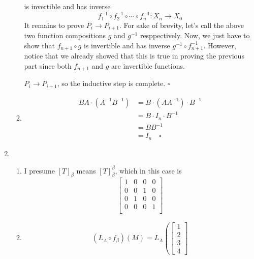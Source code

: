 \documentclass[12pt]{article}
\begin{document}
\begin{enumerate}
\begin{enumerate}
                        is invertible and has inverse
                        \[f_1^{-1} \circ f_2^{-1} \circ \cdots \circ f_n^{-1}: X_n \rightarrow X_0\]
                        It remains to prove $P_i \rightarrow P_{i+1}$.
                        For sake of brevity, let's call the above two function compositions $g$ and $g^{-1}$ resppectively.
                        Now, we just have to show that $f_{n+1} \circ g$ is invertible and has inverse $g^{-1} \circ f_{n+1}^{-1}$.
                        However, notice that we already showed that this is true in proving the previous part
                        since both $f_{n+1}$ and $g$ are invertible functions.

                        $P_i \rightarrow P_{i+1}$, so the inductive step is complete. $\square$
                  \item \begin{align*}
                              BA \cdot (A^{-1}B^{-1}) & = B \cdot (AA^{-1}) \cdot B^{-1} \\
                                                      & = B \cdot I_n \cdot B^{-1}       \\
                                                      & = BB^{-1}                        \\
                                                      & = I_n \quad\square
                        \end{align*}
            \end{enumerate}
      \item \begin{enumerate}
                  \item I presume $[T]_\beta$ means $[T]^\beta_\beta$, which in this case is
                        \[\begin{bmatrix}
                                    1 & 0 & 0 & 0 \\
                                    0 & 0 & 1 & 0 \\
                                    0 & 1 & 0 & 0 \\
                                    0 & 0 & 0 & 1 \\
                              \end{bmatrix}\]
                  \item \begin{gather*}
                              (L_A \circ f_\beta)(M)=L_A\left(\begin{bmatrix}
                                    1 \\ 2 \\ 3 \\ 4

\end{bmatrix}
\end{gather*}
\end{enumerate}
\end{enumerate}
\end{document}
